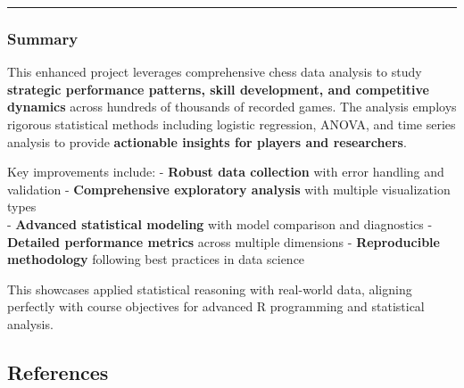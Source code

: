 \documentclass[
]{article}
\begin{document}
\begin{center}\rule{0.5\linewidth}{0.5pt}\end{center}

\subsubsection{Summary}\label{summary}

This enhanced project leverages comprehensive chess data analysis to
study \textbf{strategic performance patterns, skill development, and
competitive dynamics} across hundreds of thousands of recorded games.
The analysis employs rigorous statistical methods including logistic
regression, ANOVA, and time series analysis to provide
\textbf{actionable insights for players and researchers}.

Key improvements include: - \textbf{Robust data collection} with error
handling and validation - \textbf{Comprehensive exploratory analysis}
with multiple visualization types\\
- \textbf{Advanced statistical modeling} with model comparison and
diagnostics - \textbf{Detailed performance metrics} across multiple
dimensions - \textbf{Reproducible methodology} following best practices
in data science

This showcases applied statistical reasoning with real-world data,
aligning perfectly with course objectives for advanced R programming and
statistical analysis.

\subsection{References}\label{references}
\end{document}

